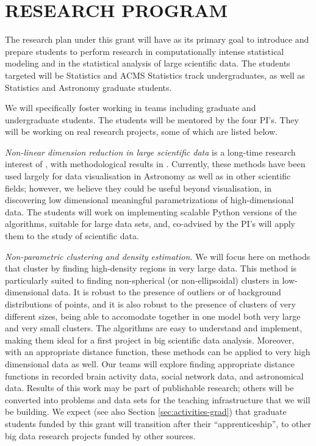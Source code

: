 \section{RESEARCH PROGRAM}
\label{sec:research}

The research plan under this grant will have as its primary goal to
introduce and prepare students to perform research in computationally
intense statistical modeling and in the statistical analysis of large
scientific data. The students targeted will be Statistics and ACMS
Statistics track undergraduates, as well as Statistics and Astronomy
graduate students. 

We will specifically foster working in teams including graduate and
undergraduate students. The students will be mentored by the four
PI's. They will be working on real research projects, some of which
are listed below. 
\bits
\item {\em Non-linear dimension reduction in large scientific data} is a long-time research interest of \meila, with methodological results in \cite{x}. Currently, these methods have been used largely for data visualisation in Astronomy as well as in other scientific fields; however, we believe they could be useful beyond visualisation, in discovering low dimensional meaningful parametrizations of high-dimensional data. The students will work on implementing scalable Python versions of the algorithms, suitable for large data sets, and, co-advised by the PI's will apply them to the study of scientific data.
\item {\em Non-parametric clustering and density estimation.} We will
  focus here on methods that cluster by finding high-density regions
  in very large data. This method is particularly suited to finding
  non-spherical (or non-ellipsoidal) clusters in low-dimensional
  data. It is robust to the presence of outliers or of background
  distributions of points, and it is also robust to the presence of
  clusters of very different sizes, being able to accomodate together
  in one model both very large and very small clusters. The algorithms
  are easy to understand and implement, making them ideal for a first
  project in big scientific data analysis. Moreover, with an
  appropriate distance function, these methods can be applied to very
  high dimensional data as well. Our teams will explore finding
  appropriate distance functions in recorded brain activity data,
  social network data, and astronomical data.  
\eits
%
Results of this work may be part of publishable research; others will
be converted into problems and data sets for the teaching
infrastructure that we will be building. We expect (see also Section
\ref{sec:activities-grad}) that graduate students funded by this grant
will transition after their ``apprenticeship'', to other big data
research projects funded by other sources. 
